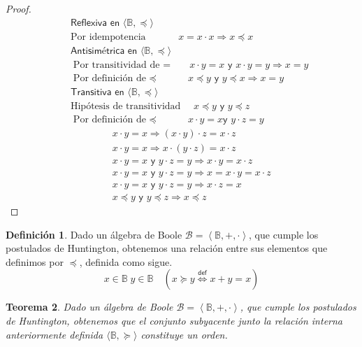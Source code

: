 \documentclass[final,12pt,a4paper,twoside,fleqn]{extbook}
\newcommand{\sthen}{\ensuremath{\Longrightarrow}}
\newcommand{\logicdef}{\ensuremath{
        \stackrel
            {\mathsf{def}}
            {\Longleftrightarrow}
}}
\newcommand{\then}{\ensuremath{\sthen}}
\newcommand{\setB}{\ensuremath{\mathbb{B}}}
\newcommand{\algB}{\ensuremath{\mathscr{B}}}
\newtheorem{thm}{Teorema}[chapter]
\theoremstyle{definition}
\newtheorem{defn}[thm]{Definición}
\theoremstyle{remark}
\begin{document}
\begin{proof}
\begin{eqnarray}
\nonumber
&&\textsf{Reflexiva en \(\langle\setB,\preccurlyeq\rangle\)  }\\
&&\text{Por idempotencia }\qquad\quad x = x \cdot x \then x \preccurlyeq x\\
&&\textsf{Antisimétrica en \(\langle\setB,\preccurlyeq\rangle\)  }\\
&&\text{Por transitividad  de \(=\) } \quad x \cdot y = x \textsf{ y } x
\cdot y = y \then x = y\\
&&\text{Por definición de \(\preccurlyeq\) } \;\qquad x \preccurlyeq y
\textsf{ y } y \preccurlyeq x \then x = y\\
&&\textsf{Transitiva en \(\langle\setB,\preccurlyeq\rangle\)  }\\
&&\text{Hipótesis de transitividad } \quad x \preccurlyeq y \textsf{ y } y
\preccurlyeq z\\
&&\text{Por definición de \(\preccurlyeq\) } \;\qquad x \cdot y = x \textsf{
y } y \cdot z = y\\
&&\qquad\;\qquad x \cdot y = x \then (x \cdot y) \cdot z = x \cdot z\\
&&\qquad\;\qquad x \cdot y = x \then x \cdot (y \cdot z) = x \cdot z\\
&&\qquad\;\qquad x \cdot y = x \textsf{ y } y \cdot z = y \then x \cdot y = x
\cdot z\\
&&\qquad\;\qquad x \cdot y = x \textsf{ y } y \cdot z = y \then x = x \cdot y
= x \cdot z\\
&&\qquad\;\qquad x \cdot y = x \textsf{ y } y \cdot z = y \then x \cdot z =
x\\
&&\qquad\;\qquad x \preccurlyeq y \textsf{ y } y \preccurlyeq z \then x
\preccurlyeq z
\end{eqnarray}
\end{proof}



\begin{defn}
Dado un álgebra de Boole \(\algB = \left\langle \setB, +, \cdot
\right\rangle\), que cumple los postulados de Huntington, obtenemos una
relación entre sus elementos que definimos por \(\preccurlyeq\), definida
como sigue.
\begin{equation}
x\in\setB\;y\in\setB\quad\left(x \succcurlyeq y \logicdef x + y =
x\right)
\end{equation}
\end{defn}



\begin{thm}
Dado un álgebra de Boole \(\algB = \left\langle \setB, +, \cdot
\right\rangle\), que cumple los postulados de Huntington, obtenemos que el
conjunto subyacente junto la relación interna anteriormente definida
\(\langle\setB,\succcurlyeq\rangle\) constituye un orden.
\end{thm}
\end{document}
